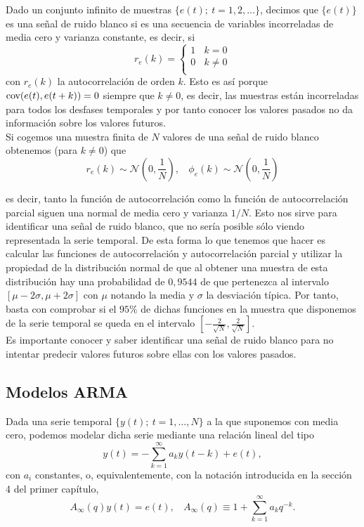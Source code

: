 Dado un conjunto infinito de muestras $\{e(t);\ t=1,2,\dots\}$, decimos que $\{e(t)\}$ es una señal de ruido blanco si es una secuencia de variables incorreladas de media cero y varianza constante, es decir, si
\begin{equation*}
	r_e(k) = 
  \left\lbrace
  \begin{array}{l}
     1 \ \ \ \ k = 0 \\
     0 \ \ \ \ k \neq 0 \\
  \end{array}
  \right.
\end{equation*}
con $r_e(k)$ la autocorrelación de orden $k$. Esto es así porque $\text{cov}{(e(t),e(t+k))} = 0$ siempre que $k \neq 0$, es decir, las muestras están incorreladas para todos los desfases temporales y por tanto conocer los valores pasados no da información sobre los valores futuros.\\
Si cogemos una muestra finita de $N$ valores de una señal de ruido blanco obtenemos (para $k \neq 0$) que
\[	r_e(k) \sim \mathcal{N} \left( 0, \frac{1}{N} \right), \ \ \ \ \phi_e(k) \sim \mathcal{N} \left( 0, \frac{1}{N} \right)	\]

es decir, tanto la función de autocorrelación como la función de autocorrelación parcial siguen una normal de media cero y varianza $1/N$. Esto nos sirve para identificar una señal de ruido blanco, que no sería posible sólo viendo representada la serie temporal. De esta forma lo que tenemos que hacer es calcular las funciones de autocorrelación y autocorrelación parcial y utilizar la propiedad de la distribución normal de que al obtener una muestra de esta distribución hay una probabilidad de $0,9544$ de que pertenezca al intervalo $[\mu - 2 \sigma, \mu + 2 \sigma]$ con $\mu$ notando la media y $\sigma$ la desviación típica. Por tanto, basta con comprobar si el $95\%$ de dichas funciones en la muestra que disponemos de la serie temporal se queda en el intervalo $[- \frac{2}{\sqrt{N}}, \frac{2}{\sqrt{N}}]$.\\

Es importante conocer y saber identificar una señal de ruido blanco para no intentar predecir valores futuros sobre ellas con los valores pasados.

\subsection{Modelos ARMA}

Dada una serie temporal $\{y(t);\ t=1,\dots,N\}$ a la que suponemos con media cero, podemos modelar dicha serie mediante una relación lineal del tipo
\[	y(t) = - \sum_{k=1}^{\infty} a_k y(t-k) + e(t), \]
con $a_i$ constantes, o, equivalentemente, con la notación introducida en la sección 4 del primer capítulo,
\[	A_{\infty}(q)y(t) = e(t), \ \ \ \ A_{\infty}(q) \equiv 1 + \sum_{k=1}^{\infty} a_k q^{-k}.	\]

